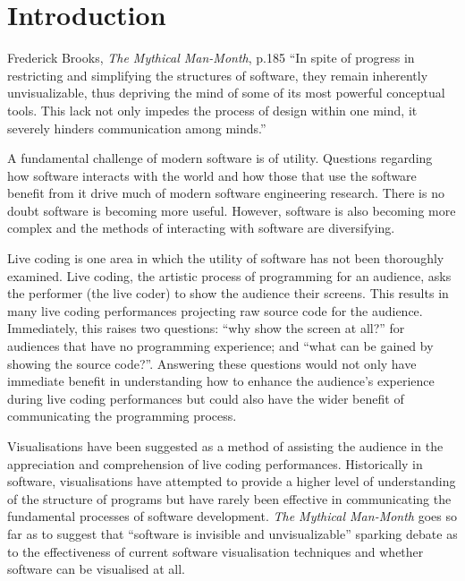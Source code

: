 
\chapter{Introduction}
\label{chap:introduction}

\begin{chapquote}{Frederick Brooks, \textit{The Mythical Man-Month}, p.185}
``In spite of progress in restricting and simplifying the structures of software, they remain inherently unvisualizable, thus depriving the mind of some of its most powerful conceptual tools. This lack not only impedes the process of design within one mind, it severely hinders communication among minds.''
\end{chapquote}


A fundamental challenge of modern software is of utility. Questions regarding how software interacts with the world and how those that use the software benefit from it drive much of modern software engineering research. There is no doubt software is becoming more useful. However, software is also becoming more complex and the methods of interacting with software are diversifying.

Live coding is one area in which the utility of software has not been thoroughly examined. Live coding, the artistic process of programming for an audience, asks the performer (the live coder) to show the audience their screens. This results in many live coding performances projecting raw source code for the audience. Immediately, this raises two questions: ``why show the screen at all?'' for audiences that have no programming experience; and ``what can be gained by showing the source code?''. Answering these questions would not only have immediate benefit in understanding how to enhance the audience's experience during live coding performances but could also have the wider benefit of communicating the programming process.

Visualisations have been suggested as a method of assisting the audience in the appreciation and comprehension of live coding performances. Historically in software, visualisations have attempted to provide a higher level of understanding of the structure of programs but have rarely been effective in communicating the fundamental processes of software development. \textit{The Mythical Man-Month} goes so far as to suggest that ``software is invisible and unvisualizable''\cite{Brooks1995} sparking debate as to the effectiveness of current software visualisation techniques and whether software can be visualised at all.

